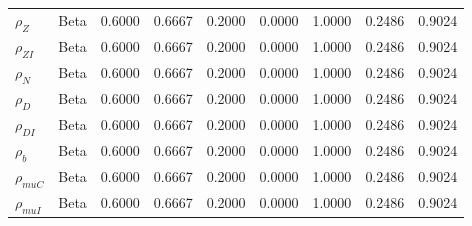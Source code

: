 \begin{center}
\begin{longtable}{lcccccccc}
$ {\rho_Z} $ & Beta & 0.6000 & 0.6667 & 0.2000 & 0.0000 & 1.0000 & 0.2486 & 0.9024 \\ 
$ {\rho_{ZI}} $ & Beta & 0.6000 & 0.6667 & 0.2000 & 0.0000 & 1.0000 & 0.2486 & 0.9024 \\ 
$ {\rho_N} $ & Beta & 0.6000 & 0.6667 & 0.2000 & 0.0000 & 1.0000 & 0.2486 & 0.9024 \\ 
$ {\rho_D} $ & Beta & 0.6000 & 0.6667 & 0.2000 & 0.0000 & 1.0000 & 0.2486 & 0.9024 \\ 
$ {\rho_{DI}} $ & Beta & 0.6000 & 0.6667 & 0.2000 & 0.0000 & 1.0000 & 0.2486 & 0.9024 \\ 
$ {\rho_b} $ & Beta & 0.6000 & 0.6667 & 0.2000 & 0.0000 & 1.0000 & 0.2486 & 0.9024 \\ 
$ {\rho_{muC}} $ & Beta & 0.6000 & 0.6667 & 0.2000 & 0.0000 & 1.0000 & 0.2486 & 0.9024 \\ 
$ {\rho_{muI}} $ & Beta & 0.6000 & 0.6667 & 0.2000 & 0.0000 & 1.0000 & 0.2486 & 0.9024 \\ 
\end{longtable}
 \end{center}

